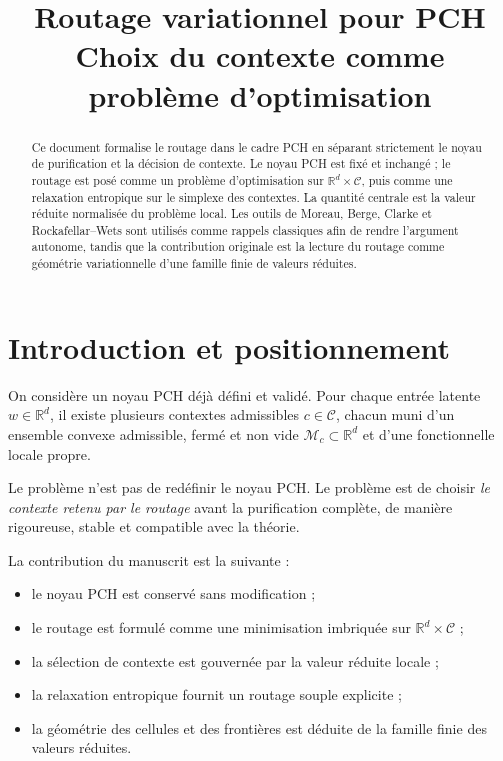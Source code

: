 \documentclass[11pt,a4paper]{article}
\title{Routage variationnel pour PCH\\
\large Choix du contexte comme problème d'optimisation}
\author{}
\date{}
\newcommand{\R}{\mathbb R}
\newcommand{\Mcal}{\mathcal M}
\newcommand{\Ccal}{\mathcal C}
\begin{document}
\maketitle

\begin{abstract}
Ce document formalise le routage dans le cadre PCH en séparant strictement le noyau de purification et la décision de contexte. Le noyau PCH est fixé et inchangé ; le routage est posé comme un problème d'optimisation sur \(\R^d\times\Ccal\), puis comme une relaxation entropique sur le simplexe des contextes. La quantité centrale est la valeur réduite normalisée du problème local. Les outils de Moreau, Berge, Clarke et Rockafellar--Wets sont utilisés comme rappels classiques afin de rendre l'argument autonome, tandis que la contribution originale est la lecture du routage comme géométrie variationnelle d'une famille finie de valeurs réduites.
\end{abstract}

\tableofcontents

\section{Introduction et positionnement}

On considère un noyau PCH déjà défini et validé. Pour chaque entrée latente \(w\in\R^d\), il existe plusieurs contextes admissibles \(c\in\Ccal\), chacun muni d'un ensemble convexe admissible, fermé et non vide \(\Mcal_c\subset\R^d\) et d'une fonctionnelle locale propre.

Le problème n'est pas de redéfinir le noyau PCH. Le problème est de choisir \emph{le contexte retenu par le routage} avant la purification complète, de manière rigoureuse, stable et compatible avec la théorie.

La contribution du manuscrit est la suivante :
\begin{itemize}[leftmargin=2em]
    \item le noyau PCH est conservé sans modification ;
    \item le routage est formulé comme une minimisation imbriquée sur \(\R^d\times\Ccal\) ;
    \item la sélection de contexte est gouvernée par la valeur réduite locale ;
    \item la relaxation entropique fournit un routage souple explicite ;
    \item la géométrie des cellules et des frontières est déduite de la famille finie des valeurs réduites.
\end{itemize}
\end{document}
